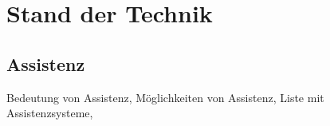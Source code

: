 
\chapter{Stand der Technik}
\label{sec:StandDerTechnik}


\section{Assistenz}

Bedeutung von Assistenz, Möglichkeiten von Assistenz, Liste mit Assistenzsysteme, 
